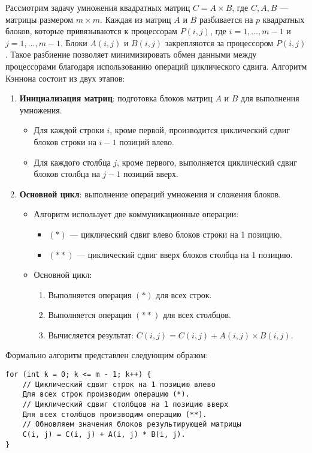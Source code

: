 \documentclass[12pt]{article}
\begin{document}
Рассмотрим задачу умножения квадратных матриц $C = A \times B$, где $C, A, B$ — матрицы размером $m \times m$. Каждая из матриц $A$ и $B$ разбивается на $p$ квадратных блоков, которые привязываются к процессорам $P(i, j)$, где $i = 1, \dots, m-1$ и $j = 1, \dots, m-1$. Блоки $A(i, j)$ и $B(i, j)$ закрепляются за процессором $P(i, j)$. Такое разбиение позволяет минимизировать обмен данными между процессорами благодаря использованию операций циклического сдвига. Алгоритм Кэннона состоит из двух этапов:
\begin{enumerate}
    \item \textbf{Инициализация матриц}: подготовка блоков матриц $A$ и $B$ для выполнения умножения.
    \begin{itemize}
        \item Для каждой строки $i$, кроме первой, производится циклический сдвиг блоков строки на $i - 1$ позиций влево.
        \item Для каждого столбца $j$, кроме первого, выполняется циклический сдвиг блоков столбца на $j - 1$ позиций вверх.
    \end{itemize}
    \item \textbf{Основной цикл}: выполнение операций умножения и сложения блоков.
    \begin{itemize}
        \item Алгоритм использует две коммуникационные операции:
        \begin{itemize}
            \item $(*)$ — циклический сдвиг влево блоков строки на 1 позицию.
            \item $(**)$ — циклический сдвиг вверх блоков столбца на 1 позицию.
        \end{itemize}
        \item Основной цикл:
        \begin{enumerate}
            \item Выполняется операция $(*)$ для всех строк.
            \item Выполняется операция $(**)$ для всех столбцов.
            \item Вычисляется результат: $C(i, j) = C(i, j) + A(i, j) \times B(i, j)$.
        \end{enumerate}
    \end{itemize}
\end{enumerate}

\clearpage

Формально алгоритм представлен следующим образом:
\begin{verbatim}
for (int k = 0; k <= m - 1; k++) {
    // Циклический сдвиг строк на 1 позицию влево
    Для всех строк производим операцию (*).
    // Циклический сдвиг столбцов на 1 позицию вверх
    Для всех столбцов производим операцию (**).
    // Обновляем значения блоков результирующей матрицы
    C(i, j) = C(i, j) + A(i, j) * B(i, j).
}
\end{verbatim}
\end{document}
